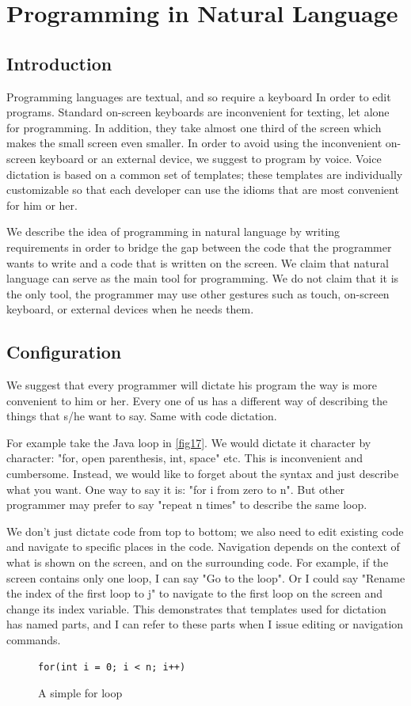 \chapter{Programming in Natural Language} \label{chapter: Programming in Natural Language}
\section{Introduction}
Programming languages are textual, and so require a keyboard In order to edit programs. Standard on-screen keyboards are inconvenient for texting, let alone for programming. In addition, they take almost one third of the screen which makes the small screen even smaller. In order to avoid using the inconvenient on-screen keyboard or an external device, we suggest to program by voice. Voice dictation is based on a common set of templates; these templates are individually customizable so that each developer can use the idioms that are most convenient for him or her.

We describe the idea of programming in natural language by writing requirements in order to bridge the gap between the code that the programmer wants to write and a code that is written on the screen. We claim that natural language can serve as the main tool for programming. We do not claim that it is the only tool, the programmer may use other gestures such as touch, on-screen keyboard, or external devices when he needs them.

\section{Configuration}
We suggest that every programmer will dictate his program the way is more convenient to him or her. Every one of us has a different way of describing the things that s/he want to say. Same with code dictation.

For example take the Java loop in \autoref{fig17}. We would dictate it character by character: "for, open parenthesis, int, space" etc. This is inconvenient and cumbersome. Instead, we would like to forget about the syntax and just describe what you want. One way to say it is: "for i from zero to n". But other programmer may prefer to say "repeat n times" to describe the same loop.

We don't just dictate code from top to bottom; we also need to edit existing code and navigate to specific places in the code. Navigation depends on the context of what is shown on the screen, and on the surrounding code. For example, if the screen contains only one loop, I can say "Go to the loop". Or I could say "Rename the index of the first loop to j" to navigate to the first loop on the screen and change its index variable. This demonstrates that templates used for dictation has named parts, and I can refer to these parts when I issue editing or navigation commands.
\begin{figure}[H]
\begin{lstlisting}
for(int i = 0; i < n; i++)
\end{lstlisting}
\caption{A simple for loop}
\label{fig17}
\end{figure}

